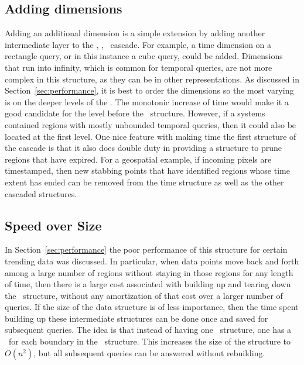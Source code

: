 \documentclass{stdbm}
\newcommand{\ct}{\id{DCT}}
\newcommand{\YList}{\id{2-Key-List}}
\newcommand{\inC}[1]{{\id{DCT_{#1}}}}
\newcommand{\X}{{\inC{X}}}
\newcommand{\Y}{{\inC{Y}}}
\newcommand{\A}{{\inC{A}}}
\begin{document}
\subsection{Adding dimensions}
%
Adding an additional dimension is a simple extension by adding another
intermediate layer to the \X, \Y, \A\ cascade.  For example, a time
dimension on a rectangle query, or in this instance a cube query,
could be added.  Dimensions that run into infinity, which is common
for temporal queries, are not more complex in this structure, as they
can be in other representations.  As discussed in
Section~\ref{sec:performance}, it is best to order the dimensions so
the most varying is on the deeper levels of the \ct.  The monotonic
increase of time would make it a good candidate for the level before
the \A\ structure.  However, if a systems contained regions with
mostly unbounded temporal queries, then it could also be located at
the first level.  One nice feature with making time the first
structure of the cascade is that it also does double duty in providing
a structure to prune regions that have expired.  For a geospatial
example, if incoming pixels are timestamped, then new stabbing points
that have identified regions whose time extent has ended can be
removed from the time structure as well as the other cascaded
structures.



\vspace*{-1ex}
\subsection{Speed over Size}
%
In Section~\ref{sec:performance} the poor performance of this
structure for certain trending data was discussed.  In particular, when
data points move back and forth among a large number of regions without
staying in those regions for any length of time, then there is a large
cost associated with building up and tearing down the \X\ structure,
without any amortization of that cost over a larger number of queries.
If the size of the data structure is of less importance, then the time
spent building up these intermediate structures can be done once and
saved for subsequent queries.  The idea is that instead of having one
\X\ structure, one has a \X\ for each boundary in the \Y\ structure.
This increases the size of the structure to $O(n^2)$, but all
subsequent queries can be answered without rebuilding.  
\end{document}
